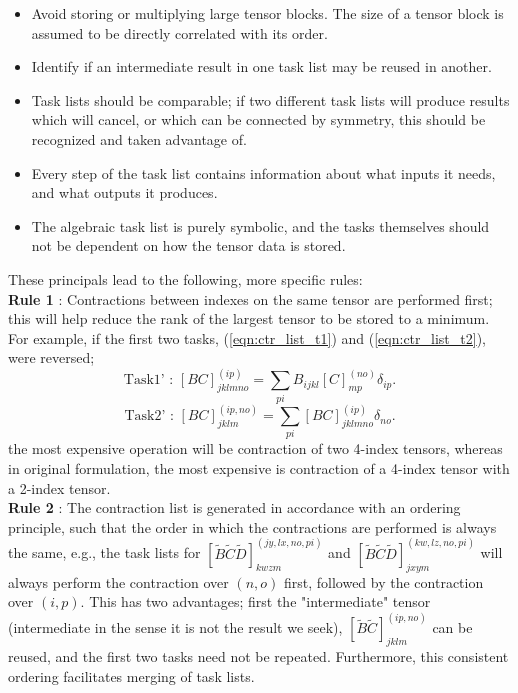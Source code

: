 \begin{itemize}
\item Avoid storing or multiplying large tensor blocks. The size of a tensor block
is assumed to be directly correlated with its order. 
\item Identify if an intermediate result in one task list may be reused in another.
\item Task lists should be comparable; if two different task lists will produce results which will cancel, or which
can be connected by symmetry, this should be recognized and taken advantage of.
\item Every step of the task list contains information about what inputs it needs, and what outputs it produces.
\item The algebraic task list is purely symbolic, and the tasks themselves should not be dependent on
how the tensor data is stored.
\end{itemize}
\noindent These principals lead to the following, more specific rules:\\

\noindent \textbf{Rule 1} : Contractions between indexes on the same tensor are
performed first; this will help reduce the rank of the largest tensor to be stored to
a minimum. For example, if the first two tasks, (\ref{eqn:ctr_list_t1})  and (\ref{eqn:ctr_list_t2}), were reversed;
\begin{equation*}
\text{Task1' \ : \ \ }
[BC]^{(ip)}_{jklmno} = \sum_{pi} B_{ijkl}[C]_{mp}^{(no)}\delta_{ip}.
\end{equation*}
\begin{equation*}
\text{Task2' \ : \ \ }
[BC]^{(ip,no)}_{jklm} = \sum_{pi} [BC]^{(ip)}_{jklmno}\delta_{no}.
\end{equation*}
the most expensive operation will be contraction of two  4-index tensors, whereas in original formulation, the most expensive is contraction of a 4-index tensor with a 2-index tensor.\\

\noindent \textbf{Rule 2} : The contraction list is generated in accordance with an
ordering principle, such that the order in which the contractions are performed
is always the same, e.g.,  the task lists for $[\tilde{B}\tilde{C}\tilde{D}]^{(jy,lx,no,pi)}_{kwzm}$
and $[\tilde{B}\tilde{C}\tilde{D}]^{(kw,lz,no,pi)}_{jxym}$ will always perform the contraction over
$(n,o)$ first, followed by the contraction over $(i,p)$. This has two 
advantages; first the "intermediate" tensor (intermediate in the sense 
it is not the result we seek), $[\tilde{B}\tilde{C}]^{(ip,no)}_{jklm}$ can be reused, and the first two tasks need not be
repeated. Furthermore, this consistent ordering facilitates merging of task lists.\\

